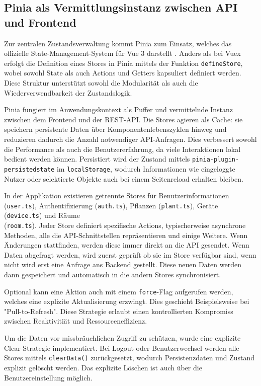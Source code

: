  \subsection{Pinia als Vermittlungsinstanz zwischen API und Frontend}
 Zur zentralen Zustandsverwaltung kommt Pinia zum Einsatz, welches das offizielle State-Management-System für Vue 3 darstellt \cite{Vuex, Allotey2023}. Anders als bei Vuex erfolgt die Definition eines Stores in Pinia mittels der Funktion \texttt{defineStore}, wobei sowohl State als auch Actions und Getters kapsuliert definiert werden. Diese Struktur unterstützt sowohl die Modularität als auch die Wiederverwendbarkeit der Zustandslogik.
 
 Pinia fungiert im Anwendungskontext als Puffer und vermittelnde Instanz zwischen dem Frontend und der REST-API. Die Stores agieren als Cache: sie speichern persistente Daten über Komponentenlebenszyklen hinweg und reduzieren dadurch die Anzahl notwendiger API-Anfragen. Dies verbessert sowohl die Performance als auch die Benutzererfahrung, da viele Interaktionen lokal bedient werden können. Persistiert wird der Zustand mittels \texttt{pinia-plugin-persistedstate} im \texttt{localStorage}, wodurch Informationen wie eingeloggte Nutzer oder selektierte Objekte auch bei einem Seitenreload erhalten bleiben.
 
 In der Applikation existieren getrennte Stores für Benutzerinformationen (\texttt{user.ts}), Authentifizierung (\texttt{auth.ts}), Pflanzen (\texttt{plant.ts}), Geräte (\texttt{device.ts}) und Räume \\ (\texttt{room.ts}). Jeder Store definiert spezifische Actions, typischerweise asynchrone Methoden, alle die API-Schnittstellen repräsentieren und einige Weitere. Wenn Änderungen stattfinden, werden diese immer direkt an die API gesendet. Wenn Daten abgefragt werden, wird zuerst geprüft ob sie im Store verfügbar sind, wenn nicht wird erst eine Anfrage ans Backend gestellt. Diese neuen Daten werden dann gespeichert und automatisch in die andern Stores synchronisiert. 
 
 Optional kann eine Aktion auch mit einem \texttt{force}-Flag aufgerufen werden, welches eine explizite Aktualisierung erzwingt. Dies geschieht Beispielsweise bei "Pull-to-Refresh". Diese Strategie erlaubt einen kontrollierten Kompromiss zwischen Reaktivitiät und Ressourceneffizienz.
 
Um die Daten vor missbräuchlichen Zugriff zu schützen, wurde eine explizite Clear-Strategie implementiert. Bei Logout oder Benutzerwechsel werden alle Stores mittels \texttt{clearData()} zurückgesetzt, wodurch Persistenzdaten und Zustand explizit gelöscht werden. Das explizite Löschen ist auch über die Benutzereinstellung möglich.

